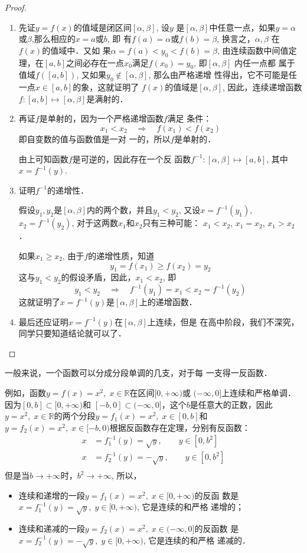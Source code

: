 \begin{proof}
\begin{enumerate}
\item 先证$y=f(x)$的值域是闭区间$[\alpha,\beta]$, 设$y$
是$[\alpha,\beta]$中任意一点，如果$y=\alpha$或$\beta$,那么相应的$x=a$或$b$, 即
有$f(a)=\alpha$或$f(b)=\beta$, 换言之，$\alpha ,\beta$  在$f(x)$的值域中．又如
果$\alpha=f(a)<y_0<f(b)=\beta  $, 由连续函数中间值定理，在$[a,
b]$之间必存在一点$x_0$满足$f(x_0)=y_0$, 即$[\alpha ,\beta]$  内任一点都
属于值域$f([a,b])$, 又如果$y_0\notin [\alpha ,\beta]$, 那么由严格递增
性得出，它不可能是任一点$x\in [a,b]$的象，这就证明了
$f(x)$的值域是$[\alpha,\beta]$, 因此，连续递增函数$f:[a,b]\mapsto [\alpha ,\beta]$是满射的．

\item 再证$f$是单射的，因为一个严格递增函数$f$满足
条件：$$x_1<x_2\quad \Rightarrow\quad f(x_1)<f(x_2)$$ 即自变数的值与函数值是一对
一的，所以$f$是单射的．

由上可知函数$f$是可逆的，因此存在一个反
函数$f^{-1}:[\alpha,\beta]\mapsto [a,b]$, 其中$x=f^{-1}(y)$.
\item 证明$f^{-1}$的递增性．

假设$y_1,y_2$是$[\alpha,\beta]$内的两个数，并且$y_1<y_2$, 又设$x=f^{-1}(y_1)$, $x_2=f^{-1}(y_2)$, 对于这两数$x_1$和$x_2$只有三种可能：
$x_1<x_2$, $x_1=x_2$, $x_1>x_2$．

如果$x_1\ge x_2$, 由于$f$的递增性质，知道
\[y_1=f(x_1)\ge f(x_2)=y_2\]
这与$y_1<y_2$的假设矛盾，因此，$x_1<x_2$, 即
\[y_1<y_2 \quad \Rightarrow\quad f^{-1}(y_1)=x_1<x_2=f^{-1}(y_2)\]
这就证明了$x=f^{-1}(y)$是$[\alpha,\beta]$上的递增函数．
\item 最后还应证明$x=f^{-1}(y)$在$[\alpha,\beta]$上连续，但是
在高中阶段，我们不深究，同学只要知道结论就可以了．
\end{enumerate}    
\end{proof} 


一般来说，一个函数可以分成分段单调的几支，对于每
一支得一反函数．

例如，函数$y=f(x)=x^2,\; x\in\mathbb{R}$在区间$[0,+\infty)$或
$(-\infty,0]$上连续和严格单调．因为$[0,b]\subset [0,+\infty)$和
$[-b,0]\subset (-\infty,0]$，这个$b$是任意大的正数，因此$y=x^2,\; x\in\mathbb{R}$的两个分段$y=f_1(x)=x^2,\; x\in [0,b]$和$y=f_2(x)=x^2,\; x\in[-b,0)$根据反函数存在定理，分别有反函数：
\[\begin{split}
    x&=f^{-1}_1(y)=\sqrt{y},\qquad y\in [0,b^2]\\    
    x&=f^{-1}_2(y)=-\sqrt{y},\qquad y\in [0,b^2]\\
\end{split}\]
但是当$b\to+\infty$时，$b^2\to+\infty$, 所以，
\begin{itemize}
    \item 连续和递增的一段$y=f_1(x)=x^2,\; x\in[0,+\infty)$的反函
数是$x=f_1^{-1}(y)=\sqrt{y},\; y\in [0,+\infty)$, 它是连续的和严格
递增的；
\item 连续和递减的一段$y=f_2(x)=x^2,\; x\in(-\infty,0]$的反函数
是$x=f_2^{-1}(y)=-\sqrt{y},\; y\in[0,+\infty)$, 它是连续的和严格
递减的．
\end{itemize}

